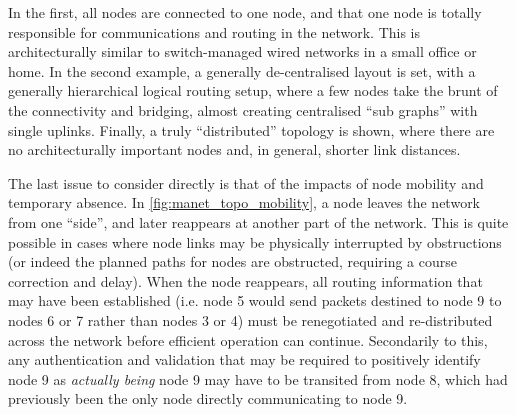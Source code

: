 In the first, all nodes are connected to one node, and that one node is totally responsible for communications and routing in the network.
This is architecturally similar to switch-managed wired networks in a small office or home.
In the second example, a generally de-centralised layout is set, with a generally hierarchical logical routing setup, where a few nodes take the brunt of the connectivity and bridging, almost creating centralised ``sub graphs'' with single uplinks.
Finally, a truly ``distributed'' topology is shown, where there are no architecturally important nodes and, in general, shorter link distances. 

The last issue to consider directly is that of the impacts of node mobility and temporary absence.
In \autoref{fig:manet_topo_mobility}, a node leaves the network from one ``side'', and later reappears at another part of the network.
This is quite possible in cases where node links may be physically interrupted by obstructions (or indeed the planned paths for nodes are obstructed, requiring a course correction and delay).
When the node reappears, all routing information that may have been established (i.e. node 5 would send packets destined to node 9 to nodes 6 or 7 rather than nodes 3 or 4) must be renegotiated and re-distributed across the network before efficient operation can continue.
Secondarily to this, any authentication and validation that may be required to positively identify node 9 as \emph{actually being} node 9 may have to be transited from node 8, which had previously been the only node directly communicating to node 9.


